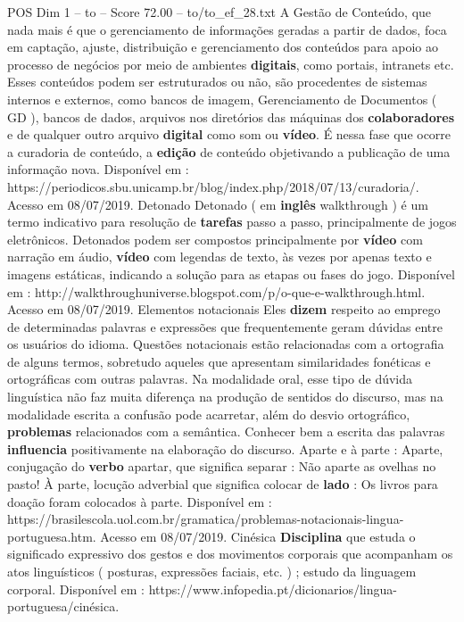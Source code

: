 \begin{textsample}{POS Dim 1 – to – Score 72.00 – to/to\_ef\_28.txt}
A Gestão de Conteúdo, que nada mais é que o gerenciamento de informações geradas a partir de dados, foca em captação, ajuste, distribuição e gerenciamento dos conteúdos para apoio ao processo de negócios por meio de ambientes \textbf{digitais}, como portais, intranets etc.
Esses conteúdos podem ser estruturados ou não, são procedentes de sistemas internos e externos, como bancos de imagem, Gerenciamento de Documentos ( GD ), bancos de dados, arquivos nos diretórios das máquinas dos \textbf{colaboradores} e de qualquer outro arquivo \textbf{digital} como som ou \textbf{vídeo}.
É nessa fase que ocorre a curadoria de conteúdo, a \textbf{edição} de conteúdo objetivando a publicação de uma informação nova.
Disponível em : https://periodicos.sbu.unicamp.br/blog/index.php/2018/07/13/curadoria/.
Acesso em 08/07/2019.
Detonado Detonado ( em \textbf{inglês} walkthrough ) é um termo indicativo para resolução de \textbf{tarefas} passo a passo, principalmente de jogos eletrônicos.
Detonados podem ser compostos principalmente por \textbf{vídeo} com narração em áudio, \textbf{vídeo} com legendas de texto, às vezes por apenas texto e imagens estáticas, indicando a solução para as etapas ou fases do jogo.
Disponível em : http://walkthroughuniverse.blogspot.com/p/o-que-e-walkthrough.html.
Acesso em 08/07/2019.
Elementos notacionais Eles \textbf{dizem} respeito ao emprego de determinadas palavras e expressões que frequentemente geram dúvidas entre os usuários do idioma.
Questões notacionais estão relacionadas com a ortografia de alguns termos, sobretudo aqueles que apresentam similaridades fonéticas e ortográficas com outras palavras.
Na modalidade oral, esse tipo de dúvida linguística não faz muita diferença na produção de sentidos do discurso, mas na modalidade escrita a confusão pode acarretar, além do desvio ortográfico, \textbf{problemas} relacionados com a semântica.
Conhecer bem a escrita das palavras \textbf{influencia} positivamente na elaboração do discurso.
Aparte e à parte : Aparte, conjugação do \textbf{verbo} apartar, que significa separar : Não aparte as ovelhas no pasto!
À parte, locução adverbial que significa colocar de \textbf{lado} : Os livros para doação foram colocados à parte.
Disponível em : https://brasilescola.uol.com.br/gramatica/problemas-notacionais-lingua-portuguesa.htm.
Acesso em 08/07/2019.
Cinésica \textbf{Disciplina} que estuda o significado expressivo dos gestos e dos movimentos corporais que acompanham os atos linguísticos ( posturas, expressões faciais, etc. ) ; estudo da linguagem corporal.
Disponível em : https://www.infopedia.pt/dicionarios/lingua-portuguesa/cinésica.

\end{textsample}
